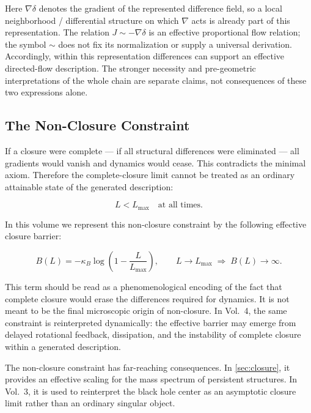 Here $\nabla\delta$ denotes the gradient of the represented difference field,
so a local neighborhood / differential structure on which $\nabla$ acts is
already part of this representation. The relation $J\sim-\nabla\delta$ is an
effective proportional flow relation; the symbol $\sim$ does not fix its
normalization or supply a universal derivation. Accordingly, within this
representation differences can support an effective directed-flow
description. The stronger necessity and pre-geometric interpretations of the
whole chain are separate claims, not consequences of these two expressions
alone.

\subsection{The Non-Closure Constraint}

If a closure were complete --- if all structural differences were eliminated
--- all gradients would vanish and dynamics would cease.
This contradicts the minimal axiom.
Therefore the complete-closure limit cannot be treated as an ordinary
attainable state of the generated description:

\begin{keybox}
\begin{equation}
  L < L_{\max} \quad \text{at all times.}
  \label{eq:prohibition}
\end{equation}
\end{keybox}

\noindent
In this volume we represent this non-closure constraint by the following
effective closure barrier:

\begin{equation}
  B(L) = -\kappa_B \log\!\left(1 - \frac{L}{L_{\max}}\right),
  \qquad
  L \to L_{\max} \;\Rightarrow\; B(L) \to \infty.
  \label{eq:barrier}
\end{equation}

This term should be read as a phenomenological encoding of the fact that
complete closure would erase the differences required for dynamics.
It is not meant to be the final microscopic origin of non-closure.
In Vol.~4,
the same constraint is reinterpreted dynamically:
the effective barrier may emerge from delayed rotational feedback,
dissipation,
and the instability of complete closure within a generated description.

\begin{remark}
The non-closure constraint has far-reaching consequences.
In \cref{sec:closure}, it provides an effective scaling for the mass spectrum
of persistent structures.
In Vol.~3, it is used to reinterpret the black hole center as an
asymptotic closure limit rather than an ordinary singular object.
\end{remark}
